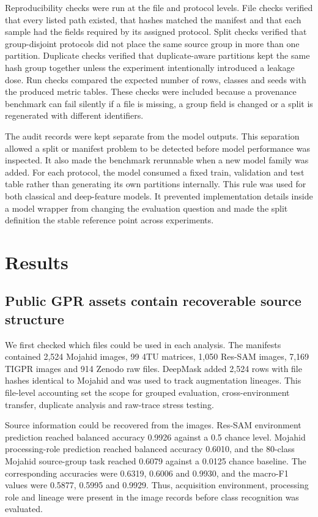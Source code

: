 \documentclass[]{interact}
\begin{document}
Reproducibility checks were run at the file and protocol levels. File checks verified that every listed path existed, that hashes matched the manifest and that each sample had the fields required by its assigned protocol. Split checks verified that group-disjoint protocols did not place the same source group in more than one partition. Duplicate checks verified that duplicate-aware partitions kept the same hash group together unless the experiment intentionally introduced a leakage dose. Run checks compared the expected number of rows, classes and seeds with the produced metric tables. These checks were included because a provenance benchmark can fail silently if a file is missing, a group field is changed or a split is regenerated with different identifiers.

The audit records were kept separate from the model outputs. This separation allowed a split or manifest problem to be detected before model performance was inspected. It also made the benchmark rerunnable when a new model family was added. For each protocol, the model consumed a fixed train, validation and test table rather than generating its own partitions internally. This rule was used for both classical and deep-feature models. It prevented implementation details inside a model wrapper from changing the evaluation question and made the split definition the stable reference point across experiments.

\section{Results}

\subsection{Public GPR assets contain recoverable source structure}

We first checked which files could be used in each analysis. The manifests contained 2,524 Mojahid images, 99 4TU matrices, 1,050 Res-SAM images, 7,169 TIGPR images and 914 Zenodo raw files. DeepMask added 2,524 rows with file hashes identical to Mojahid and was used to track augmentation lineages. This file-level accounting set the scope for grouped evaluation, cross-environment transfer, duplicate analysis and raw-trace stress testing.

Source information could be recovered from the images. Res-SAM environment prediction reached balanced accuracy 0.9926 against a 0.5 chance level. Mojahid processing-role prediction reached balanced accuracy 0.6010, and the 80-class Mojahid source-group task reached 0.6079 against a 0.0125 chance baseline. The corresponding accuracies were 0.6319, 0.6006 and 0.9930, and the macro-F1 values were 0.5877, 0.5995 and 0.9929. Thus, acquisition environment, processing role and lineage were present in the image records before class recognition was evaluated.
\end{document}
